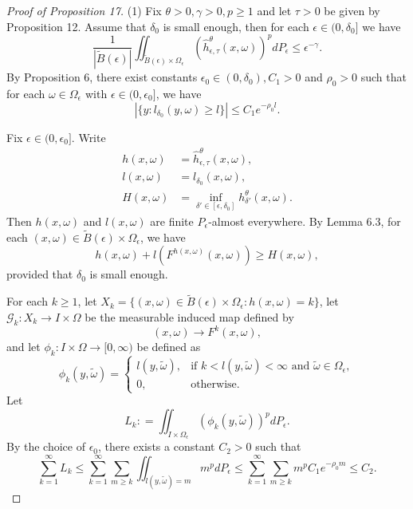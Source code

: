 \documentclass[11pt,oneside]{article}
\theoremstyle{plain}
\numberwithin{equation}{section}
\numberwithin{figure}{section}
\numberwithin{table}{section}
\begin{document}
\begin{proof}[Proof of Proposition 17]

(1) Fix $\theta>0, \gamma>0, p \geq 1$ and let $\tau >0$ be given by Proposition 12. Assume that $\delta_0$ is small enough, then for each $\epsilon \in (0, \delta_0]$ we have
\begin{equation}
\frac{1}{|\tilde B(\epsilon)|} \iint_{\tilde B(\epsilon) \times \Omega_{\epsilon}} (\hat h^{\theta}_{\epsilon, \tau} (x, \omega) )^p dP_{\epsilon} \leq \epsilon^{- \gamma}.
\end{equation}
By Proposition 6, there exist constants $\epsilon_0 \in (0, \delta_0), C_1>0$ and $\rho_0 >0$ such that for each $\omega \in \Omega_{\epsilon}$ with $\epsilon \in (0, \epsilon_0]$, we have
\[
|\{ y : l_{\delta_0}(y, \omega) \geq l \} | \leq C_1 e^{- \rho_0 l}.
\]


Fix $\epsilon \in (0, \epsilon_0]$. Write
\begin{align*}
h(x, \omega) & = \hat h_{\epsilon, \tau}^{\theta} (x, \omega), \\
l(x, \omega) & = l_{\delta_0} (x, \omega),\\
H(x, \omega) & = \inf_{\delta' \in [\epsilon, \delta_0]} h_{\delta'}^{\theta} (x, \omega).
\end{align*}
Then $h(x, \omega)$ and $l(x, \omega)$ are finite $P_{\epsilon}$-almost everywhere. By Lemma 6.3, for each $(x, \omega) \in \tilde B(\epsilon) \times \Omega_{\epsilon}$, we have 
\begin{equation}
h(x, \omega) + l(F^{h(x, \omega)} (x, \omega)) \geq H(x, \omega),
\end{equation}
provided that $\delta_0$ is small enough. 


For each $k \geq 1$, let $X_k = \{ (x, \omega) \in \tilde B(\epsilon) \times \Omega_{\epsilon} : h(x, \omega) = k\}$, let $\mathscr G_k: X_k \to I \times \Omega$ be the measurable induced map defined by 
\[
(x, \omega) \to F^k(x, \omega),
\]
and let $\phi_k : I \times \Omega  \to [0, \infty)$ be defined as
\[
\phi_k(y, \tilde \omega) = \begin{cases}
l(y, \tilde \omega), & \mbox{if $k < l(y, \tilde \omega) < \infty$ and $\tilde \omega \in \Omega_{\epsilon}$}, \\
0, & \mbox{otherwise}.
\end{cases}
\]
Let 
\[
L_k : = \iint_{I \times \Omega_{\epsilon}} (\phi_k(y, \tilde \omega))^p d P_{\epsilon}.
\]
By the choice of $\epsilon_0$, there exists a constant $C_2 > 0$ such that
\begin{equation}
\sum_{k=1}^{\infty} L_k \leq \sum_{k=1}^{\infty} \sum_{m \geq k} \iint_{l(y, \tilde \omega) = m} m^p d P_{\epsilon} \leq \sum_{k=1}^{\infty} \sum_{m \geq k} m^p C_1 e^{-\rho_0 m} \leq C_2.
\end{equation}



\end{proof}
\end{document}
